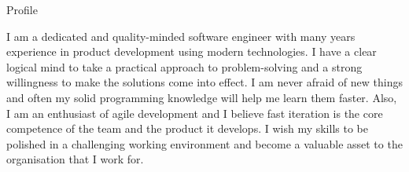 \documentclass[print]{mcdowellcv}
\begin{document}
	\makeheader
	
	\begin{cvsection}{Profile}
		\begin{cvsubsection}{}{}{}	
		I am a dedicated and quality-minded software engineer with many years experience in product development using modern technologies. I have a clear logical mind to take a practical approach to problem-solving and a strong willingness to make the solutions come into effect. I am never afraid of new things and often my solid programming knowledge will help me learn them faster. Also, I am an enthusiast of agile development and I believe fast iteration is the core competence of the team and the product it develops. I wish my skills to be polished in a challenging working environment and become a valuable asset to the organisation that I work for.
		\end{cvsubsection}
	\end{cvsection}
\end{document}
